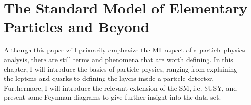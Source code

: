 \chapter{The Standard Model of Elementary Particles and Beyond}
Although this paper will primarily emphasize the \ac{ML} aspect of a particle physics analysis, there are still terms and phenomena that are 
worth defining. In this chapter, I will introduce the basics of particle physics, ranging from explaining the leptons and quarks to defining 
the layers inside a particle detector. Furthermore, I will introduce the relevant extension of the \ac{SM}, i.e. \acf{SUSY}, and present some 
Feynman diagrams to give further insight into the data set.